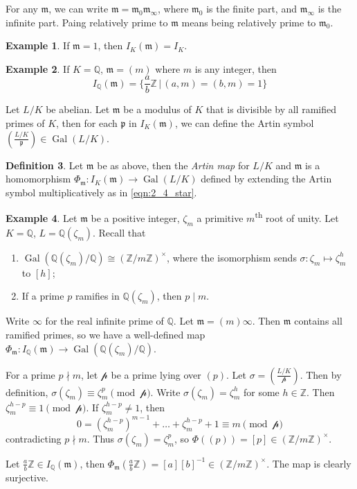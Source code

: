 \documentclass[11pt]{article}
\theoremstyle{definition}
\newtheorem{definition}{Definition}[section]
\newtheorem{example}[definition]{Example}
\theoremstyle{plain}
\theoremstyle{remark}
\DeclareMathOperator{\Gal}{Gal}
\newcommand{\ZZ}{\mathbb{Z}}
\newcommand{\QQ}{\mathbb{Q}}
\newcommand{\cp}{\mathcal{p}}
\newcommand{\fp}{\mathfrak{p}}
\newcommand{\fm}{\mathfrak{m}}
\newcommand{\leg}[2]{\left(\frac{#1}{#2}\right)}
\begin{document}
For any $\fm$, we can write $\fm = \fm_0 \fm_\infty$, where $\fm_0$ is the finite part, and $\fm_\infty$ is the infinite part. Paing relatively prime to $\fm$ means being relatively prime to $\fm_0$.

\begin{example}\label{eg:2_8}
    If $\fm = 1$, then $I_K(\fm) = I_K$.
\end{example}

\begin{example}\label{eg:2_9}
    If $K = \QQ$, $\fm = (m)$ where $m$ is any integer, then
    \begin{equation*}
        I_\QQ(\fm) = \bigg\{ \frac{a}{b}\ZZ \,\bigg\vert\, (a, m) = (b, m) = 1 \bigg\}
    \end{equation*}
\end{example}

Let $L/K$ be abelian. Let $\fm$ be a modulus of $K$ that is divisible by all ramified primes of $K$, then for each $\fp$ in $I_K(\fm)$, we can define the Artin symbol $\leg{L/K}{\fp} \in \Gal(L/K)$.

\begin{definition}\label{def:2_10}
    Let $\fm$ be as above, then the \emph{Artin map} for $L/K$ and $\fm$ is a homomorphism $\Phi_{\fm} : I_K(\fm) \to \Gal(L/K)$ defined by extending the Artin symbol multiplicatively as in \eqref{eqn:2_4_star}.
\end{definition}

\begin{example}\label{eg:2_11}
    Let $\fm$ be a positive integer, $\zeta_m$ a primitive $m$\textsuperscript{th} root of unity. Let $K = \QQ$, $L = \QQ(\zeta_m)$. Recall that
    \begin{enumerate}
        \item $\Gal(\QQ(\zeta_m) / \QQ) \cong (\ZZ / m \ZZ)^\times$, where the isomorphism sends $\sigma : \zeta_m \mapsto \zeta_m^h$ to $[h]$;
        \item If a prime $p$ ramifies in $\QQ(\zeta_m)$, then $p \mid m$.
    \end{enumerate}
    Write $\infty$ for the real infinite prime of $\QQ$. Let $\fm = (m) \infty$. Then $\fm$ contains all ramified primes, so we have a well-defined map $\Phi_\fm : I_\QQ(\fm) \to \Gal(\QQ(\zeta_m) / \QQ)$.

    For a prime $p \nmid m$, let $\cp$ be a prime lying over $(p)$. Let $\sigma = \leg{L/K}{\cp}$. Then by definition, $\sigma(\zeta_m) \equiv \zeta_m^p \pmod{\cp}$. Write $\sigma(\zeta_m) = \zeta_m^h$ for some $h \in \ZZ$. Then $\zeta_m^{h-p} \equiv 1 \pmod{\cp}$. If $\zeta_m^{h-p} \neq 1$, then
    \begin{equation*}
        0 = (\zeta_m^{h-p})^{m-1} + \ldots + \zeta_m^{h-p} + 1 \equiv m \pmod{\cp}
    \end{equation*}
    contradicting $p \nmid m$. Thus $\sigma(\zeta_m) = \zeta_m^p$, so $\Phi((p)) = [p] \in (\ZZ / m \ZZ)^\times$.

    Let $\frac{a}{b}\ZZ \in I_\QQ(\fm)$, then $\Phi_\fm(\frac{a}{b} \ZZ) = [a][b]^{-1} \in (\ZZ / m \ZZ)^\times$.
    The map is clearly surjective.
\end{example}
\end{document}
